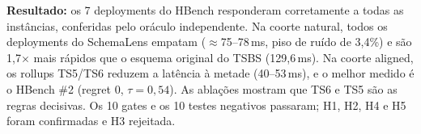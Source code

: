 \textbf{Resultado:} os 7 deployments do HBench responderam corretamente a todas as instâncias, conferidas pelo oráculo independente. Na coorte natural, todos os deployments do SchemaLens empatam ($\approx$75--78\,ms, piso de ruído de 3,4\%) e são 1,7$\times$ mais rápidos que o esquema original do TSBS (129,6\,ms). Na coorte aligned, os rollups TS5/TS6 reduzem a latência à metade (40--53\,ms), e o melhor medido é o HBench \#2 (regret 0, $\tau=0{,}54$). As ablações mostram que TS6 e TS5 são as regras decisivas. Os 10 gates e os 10 testes negativos passaram; H1, H2, H4 e H5 foram confirmadas e H3 rejeitada.
